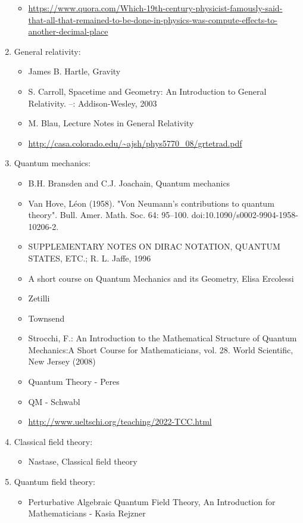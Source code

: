 \documentclass{report}
\begin{document}
\begin{enumerate}
\begin{itemize}
\item \url{https://www.quora.com/Which-19th-century-physicist-famously-said-that-all-that-remained-to-be-done-in-physics-was-compute-effects-to-another-decimal-place}
\end{itemize}
\item General relativity:
\begin{itemize}
\item James B. Hartle, Gravity
\item S. Carroll, Spacetime and Geometry: An Introduction to General Relativity. --: Addison-Wesley, 2003
\item M. Blau, Lecture Notes in General Relativity
\item \url{http://casa.colorado.edu/~ajsh/phys5770_08/grtetrad.pdf}
\end{itemize}
\item Quantum mechanics:
\begin{itemize}
\item B.H. Bransden and C.J. Joachain, Quantum mechanics
\item Van Hove, Léon (1958). "Von Neumann's contributions to quantum theory". Bull. Amer. Math. Soc. 64: 95–100. doi:10.1090/s0002-9904-1958-10206-2.
\item SUPPLEMENTARY NOTES ON DIRAC NOTATION,
QUANTUM STATES, ETC.; R. L. Jaffe, 1996
\item A short course on Quantum Mechanics and its Geometry, Elisa Ercolessi
\item Zetilli
\item Townsend
\item Strocchi, F.: An Introduction to the Mathematical Structure of Quantum Mechanics:A Short Course for Mathematicians, vol. 28. World Scientific, New Jersey (2008)
\item Quantum Theory - Peres
\item QM - Schwabl
\item \url{http://www.ueltschi.org/teaching/2022-TCC.html}
\end{itemize}
\item Classical field theory:
\begin{itemize}
\item Nastase, Classical field theory
\end{itemize}
\item Quantum field theory:
\begin{itemize}
\item Perturbative Algebraic Quantum Field Theory, An Introduction for Mathematicians - Kasia Rejzner

\end{itemize}
\end{enumerate}
\end{document}
